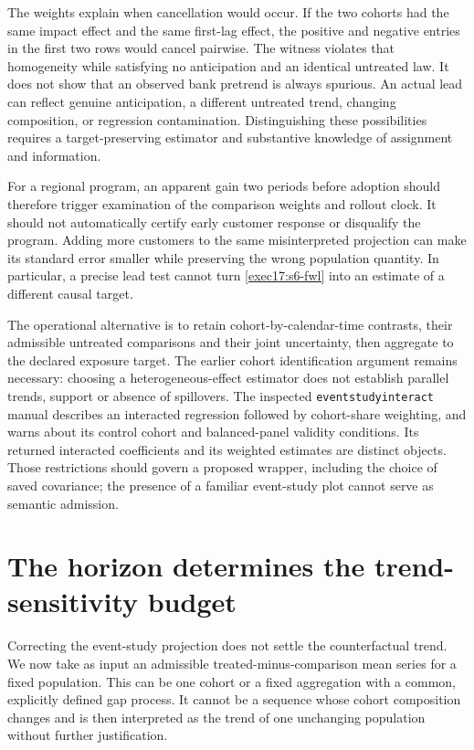 The weights explain when cancellation would occur. If the two cohorts had
the same impact effect and the same first-lag effect, the positive and negative
entries in the first two rows would cancel pairwise. The witness violates
that homogeneity while satisfying no anticipation and an identical untreated
law. It does not show that an observed bank pretrend is always spurious.
An actual lead can reflect genuine anticipation, a different untreated trend,
changing composition, or regression contamination. Distinguishing these
possibilities requires a target-preserving estimator and substantive knowledge
of assignment and information.

For a regional program, an apparent gain two periods before adoption should
therefore trigger examination of the comparison weights and rollout clock.
It should not automatically certify early customer response or disqualify the
program. Adding more customers to the same misinterpreted projection can
make its standard error smaller while preserving the wrong population
quantity. In particular, a precise lead test cannot turn
\eqref{exec17:s6-fwl} into an estimate of a different causal target.

The operational alternative is to retain cohort-by-calendar-time contrasts,
their admissible untreated comparisons and their joint uncertainty, then
aggregate to the declared exposure target. The earlier cohort identification
argument remains necessary: choosing a heterogeneous-effect estimator does
not establish parallel trends, support or absence of spillovers.
The inspected \texttt{eventstudyinteract} manual describes an interacted
regression followed by cohort-share weighting, and warns about its control
cohort and balanced-panel validity conditions. Its returned interacted
coefficients and its weighted estimates are distinct objects.
Those restrictions should govern a proposed wrapper, including the choice
of saved covariance; the presence of a familiar event-study plot cannot
serve as semantic admission.~\citep{v12_sw_eventstudyinteract}

\section{The horizon determines the trend-sensitivity budget}
\label{exec17:s6-curvature}

Correcting the event-study projection does not settle the counterfactual
trend. We now take as input an admissible treated-minus-comparison mean
series for a fixed population. This can be one cohort or a fixed aggregation
with a common, explicitly defined gap process. It cannot be a sequence whose
cohort composition changes and is then interpreted as the trend of one
unchanging population without further justification.

